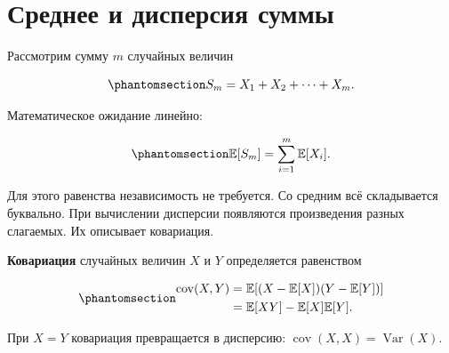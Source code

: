 \documentclass[
  russian,
  11pt,
  a4paper,
  open=any]{scrbook}
\begin{document}
\section{Среднее и дисперсия
суммы}\label{ux441ux440ux435ux434ux43dux435ux435-ux438-ux434ux438ux441ux43fux435ux440ux441ux438ux44f-ux441ux443ux43cux43cux44b}

Рассмотрим сумму \(m\) случайных величин

\begin{equation}\protect\phantomsection\label{eq-random-sum-definition}{
S_m=X_1+X_2+\cdots+X_m.
}\end{equation}

Математическое ожидание линейно:

\begin{equation}\protect\phantomsection\label{eq-random-sum-mean}{
\mathbb E[S_m]
=\sum_{i=1}^{m}\mathbb E[X_i].
}\end{equation}

Для этого равенства независимость не требуется. Со средним всё
складывается буквально. При вычислении дисперсии появляются произведения
разных слагаемых. Их описывает ковариация.

\begin{booknote}

\textbf{Ковариация} случайных величин \(X\) и \(Y\) определяется
равенством

\begin{equation}\protect\phantomsection\label{eq-covariance-definition-clt}{
\begin{aligned}
\operatorname{cov}(X,Y)
&=\mathbb E\!\left[
(X-\mathbb E[X])(Y-\mathbb E[Y])
\right]\\
&=\mathbb E[XY]-\mathbb E[X]\mathbb E[Y].
\end{aligned}
}\end{equation}

При \(X=Y\) ковариация превращается в дисперсию:
\(\operatorname{cov}(X,X)=\operatorname{Var}(X)\).

\end{booknote}
\end{document}
